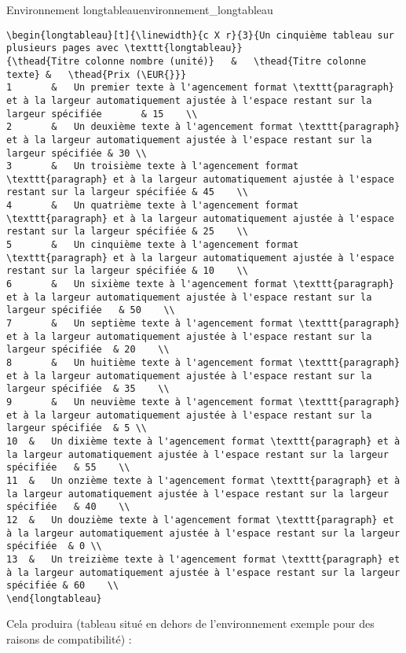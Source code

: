 \documentclass[a4paper, 11pt, twoside, fleqn]{memoir}
\begin{document}
\begin{exemple}{Environnement longtableau}{environnement_longtableau}
\begin{verbatim}
\begin{longtableau}[t]{\linewidth}{c X r}{3}{Un cinquième tableau sur plusieurs pages avec \texttt{longtableau}}
{\thead{Titre colonne nombre (unité)} 	&	\thead{Titre colonne texte}	&	\thead{Prix (\EUR{}}}
1		&	Un premier texte à l'agencement format \texttt{paragraph} et à la largeur automatiquement ajustée à l'espace restant sur la largeur spécifiée 		& 15	\\
2		&	Un deuxième texte à l'agencement format \texttt{paragraph} et à la largeur automatiquement ajustée à l'espace restant sur la largeur spécifiée & 30	\\
3		&	Un troisième texte à l'agencement format \texttt{paragraph} et à la largeur automatiquement ajustée à l'espace restant sur la largeur spécifiée	& 45	\\
4		&	Un quatrième texte à l'agencement format \texttt{paragraph} et à la largeur automatiquement ajustée à l'espace restant sur la largeur spécifiée	& 25	\\
5		&	Un cinquième texte à l'agencement format \texttt{paragraph} et à la largeur automatiquement ajustée à l'espace restant sur la largeur spécifiée	& 10	\\
6		&	Un sixième texte à l'agencement format \texttt{paragraph} et à la largeur automatiquement ajustée à l'espace restant sur la largeur spécifiée	& 50	\\
7		&	Un septième texte à l'agencement format \texttt{paragraph} et à la largeur automatiquement ajustée à l'espace restant sur la largeur spécifiée	& 20	\\
8		&	Un huitième texte à l'agencement format \texttt{paragraph} et à la largeur automatiquement ajustée à l'espace restant sur la largeur spécifiée	& 35	\\
9		&	Un neuvième texte à l'agencement format \texttt{paragraph} et à la largeur automatiquement ajustée à l'espace restant sur la largeur spécifiée	& 5	\\
10	&	Un dixième texte à l'agencement format \texttt{paragraph} et à la largeur automatiquement ajustée à l'espace restant sur la largeur spécifiée	& 55	\\
11	&	Un onzième texte à l'agencement format \texttt{paragraph} et à la largeur automatiquement ajustée à l'espace restant sur la largeur spécifiée	& 40	\\
12	&	Un douzième texte à l'agencement format \texttt{paragraph} et à la largeur automatiquement ajustée à l'espace restant sur la largeur spécifiée	& 0	\\
13	&	Un treizième texte à l'agencement format \texttt{paragraph} et à la largeur automatiquement ajustée à l'espace restant sur la largeur spécifiée	& 60	\\
\end{longtableau}
\end{verbatim}

Cela produira (tableau situé en dehors de l'environnement exemple pour des raisons de compatibilité) :\\

\end{exemple}
\end{document}
